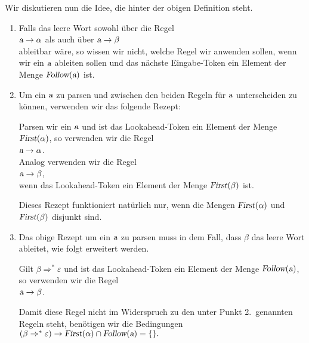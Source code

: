 \noindent
Wir diskutieren nun die Idee, die hinter der obigen Definition steht.
\begin{enumerate}
\item Falls das leere Wort sowohl über die Regel
      \\[0.2cm]
      \hspace*{1.3cm}
      $\textsl{a} \rightarrow \alpha$ \quad als auch über \quad $\textsl{a} \rightarrow \beta$
      \\[0.2cm]
      ableitbar wäre, so wissen wir nicht, welche Regel wir anwenden sollen, wenn
      wir ein $\textsl{a}$ ableiten sollen und das nächste Eingabe-Token ein Element der Menge
      $\textsl{Follow}(\textsl{a})$ ist.
\item Um ein $\textsl{a}$ zu parsen und zwischen den beiden Regeln für $\textsl{a}$ unterscheiden zu können,
      verwenden wir das folgende Rezept:

      Parsen wir ein $\textsl{a}$ und ist das Lookahead-Token ein Element der Menge
      $\textsl{First}(\alpha)$, so verwenden wir die Regel
      \\[0.2cm]
      \hspace*{1.3cm}
      $\textsl{a} \rightarrow \alpha$.
      \\[0.2cm]
      Analog verwenden wir die Regel
      \\[0.2cm]
      \hspace*{1.3cm}
      $\textsl{a} \rightarrow \beta$,
      \\[0.2cm]
      wenn das Lookahead-Token ein Element der Menge $\textsl{First}(\beta)$ ist.

      Dieses Rezept funktioniert natürlich nur, wenn die Mengen $\textsl{First}(\alpha)$
      und $\textsl{First}(\beta)$ disjunkt sind.
\item Das obige Rezept um ein $\textsl{a}$ zu parsen muss in dem Fall, dass $\beta$ das leere Wort
      ableitet, wie folgt erweitert werden.
  
      Gilt $\beta \Rightarrow^* \varepsilon$ und ist das Lookahead-Token ein Element der
      Menge $\textsl{Follow}(\textsl{a})$, so verwenden wir die Regel
      \\[0.2cm]
      \hspace*{1.3cm}
      $\textsl{a} \rightarrow \beta$.
     
      Damit diese Regel nicht im Widerspruch zu den unter Punkt 2.~genannten Regeln steht,
      benötigen wir die Bedingungen
      \\[0.2cm]
      \hspace*{1.3cm}
      $(\beta  \Rightarrow^* \varepsilon) \rightarrow \textsl{First}(\alpha) \cap \textsl{Follow}(\textsl{a}) = \{\}.$ 
\end{enumerate}

